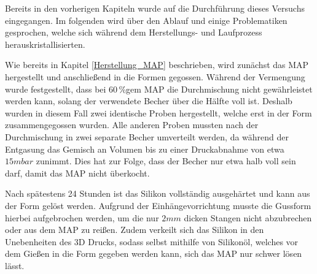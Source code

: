 Bereits in den vorherigen Kapiteln wurde auf die Durchführung dieses Versuchs eingegangen. Im folgenden wird über den Ablauf und einige Problematiken gesprochen, welche sich während dem Herstellungs- und Laufprozess herauskristallisierten. 

Wie bereits in Kapitel \ref{Herstellung_MAP} beschrieben, wird zunächst das MAP hergestellt und anschließend in die Formen gegossen. Während der Vermengung wurde festgestellt, dass bei 60\,\%gem MAP die Durchmischung nicht gewährleistet werden kann, solang der verwendete Becher über die Hälfte voll ist. Deshalb wurden in diesem Fall zwei identische Proben hergestellt, welche erst in der Form zusammengegossen wurden. Alle anderen Proben mussten nach der Durchmischung in zwei separate Becher umverteilt werden, da während der Entgasung das Gemisch an Volumen bis zu einer Druckabnahme von etwa $15 \unit{mbar}$ zunimmt. Dies hat zur Folge, dass der Becher nur etwa halb voll sein darf, damit das MAP nicht \glqq überkocht\grqq{}. 

Nach spätestens 24 Stunden ist das Silikon vollständig ausgehärtet und kann aus der Form gelöst werden. Aufgrund der Einhängevorrichtung musste die Gussform hierbei aufgebrochen werden, um die nur $2 \unit{mm}$ dicken Stangen nicht abzubrechen oder aus dem MAP zu reißen. Zudem verkeilt sich das Silikon in den Unebenheiten des 3D Drucks, sodass selbst mithilfe von Silikonöl, welches vor dem Gießen in die Form gegeben werden kann, sich das MAP nur schwer lösen lässt. 





